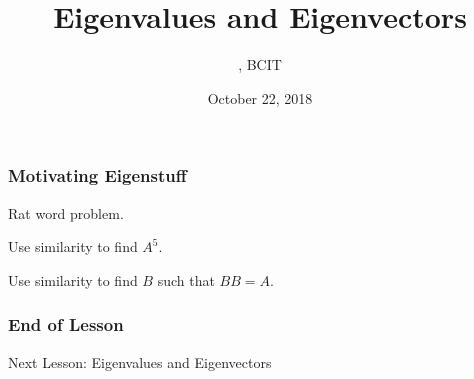\documentclass[xcolor=dvipsnames]{beamer}
\title{Eigenvalues and Eigenvectors}
\subtitle{{\CourseNumber}, BCIT}
\author{\CourseName}
\date{October 22, 2018}
\begin{document}
\begin{frame}
  \titlepage
\end{frame}

\begin{frame}
  \frametitle{Motivating Eigenstuff}
  Rat word problem.

  Use similarity to find $A^{5}$.

  Use similarity to find $B$ such that $BB=A$.
\end{frame}

\begin{frame}
  \frametitle{End of Lesson}
Next Lesson: Eigenvalues and Eigenvectors
\end{frame}
\end{document}
